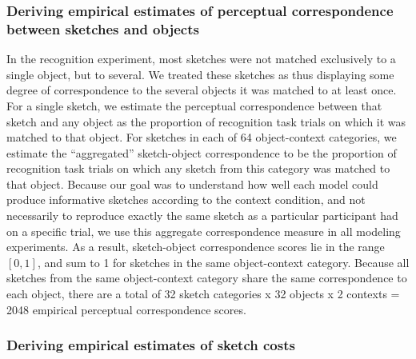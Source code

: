 \documentclass{svjour3}
\begin{document}
\subsubsection*{Deriving empirical estimates of perceptual correspondence between sketches and objects}

In the recognition experiment, most sketches were not matched exclusively to a single object, but to several. 
We treated these sketches as thus displaying some degree of correspondence to the several objects it was matched to at least once. 
For a single sketch, we estimate the perceptual correspondence between that sketch and any object as the proportion of recognition task trials on which it was matched to that object. 
For sketches in each of 64 object-context categories, we estimate the ``aggregated'' sketch-object correspondence to be the proportion of recognition task trials on which any sketch from this category was matched to that object. 
Because our goal was to understand how well each model could produce informative sketches according to the context condition, and not necessarily to reproduce exactly the same sketch as a particular participant had on a specific trial, we use this aggregate correspondence measure in all modeling experiments.  
As a result, sketch-object correspondence scores lie in the range $[0,1]$, and sum to 1 for sketches in the same object-context category. 
Because all sketches from the same object-context category share the same correspondence to each object, there are a total of 32 sketch categories x 32 objects x 2 contexts = 2048 empirical perceptual correspondence scores.


\subsubsection*{Deriving empirical estimates of sketch costs}
\end{document}
